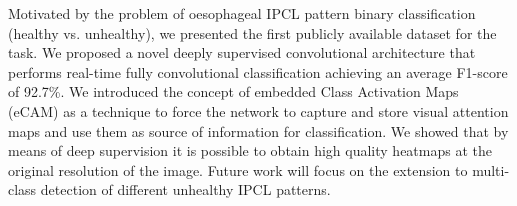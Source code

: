 \documentclass[runningheads]{llncs}
\begin{document}
Motivated by the problem of oesophageal IPCL pattern binary classification (healthy vs. unhealthy), we presented the first publicly available dataset for the task. We proposed a novel deeply supervised convolutional architecture that performs real-time fully convolutional classification achieving an average F1-score of 92.7\%. We introduced the concept of embedded Class Activation Maps (eCAM) as a technique to force the network to capture and store visual attention maps and use them as source of information for classification. We showed that by means of deep supervision it is possible to obtain high quality heatmaps at the original resolution of the image. Future work will focus on the extension to multi-class detection of different unhealthy IPCL patterns.




\end{document}
